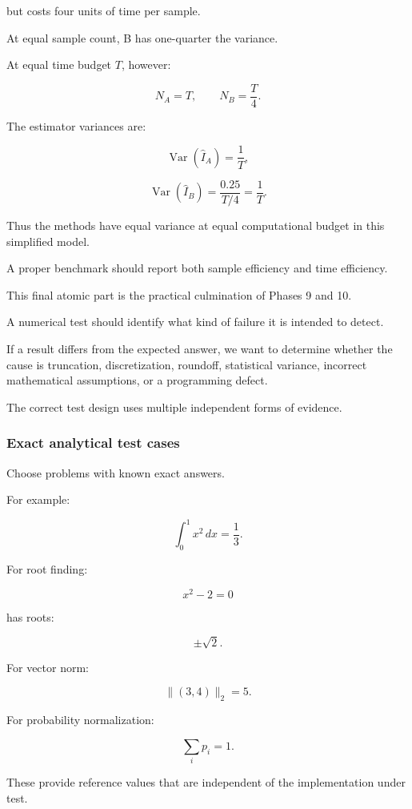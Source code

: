 but costs four units of time per sample.

At equal sample count, B has one-quarter the variance.

At equal time budget \(T\), however:

\[ N_A=T, \qquad N_B=\frac T4. \]

The estimator variances are:

\[ \operatorname{Var}(\hat I_A)=\frac1T, \]

\[ \operatorname{Var}(\hat I_B) = \frac{0.25}{T/4} =\frac1T. \]

Thus the methods have equal variance at equal computational budget in this simplified model.

A proper benchmark should report both sample efficiency and time efficiency.

This final atomic part is the practical culmination of Phases 9 and 10.

A numerical test should identify what kind of failure it is intended to detect.

If a result differs from the expected answer, we want to determine whether the cause is truncation, discretization, roundoff, statistical variance, incorrect mathematical assumptions, or a programming defect.

The correct test design uses multiple independent forms of evidence.

\subsubsection{Exact analytical test cases}\label{02-foundations-ii-ch031-exact-analytical-test-cases}

\hypertarget{02-foundations-ii-ch031-exact-analytical-test-cases}{}

Choose problems with known exact answers.

For example:

\[ \int_0^1x^2\,dx=\frac13. \]

For root finding:

\[ x^2-2=0 \]

has roots:

\[ \pm\sqrt2. \]

For vector norm:

\[ \|(3,4)\|_2=5. \]

For probability normalization:

\[ \sum_ip_i=1. \]

These provide reference values that are independent of the implementation under test.

